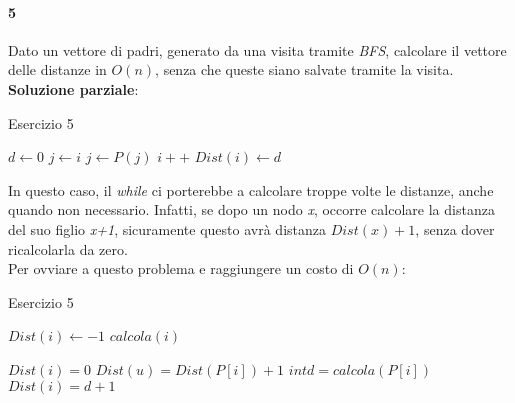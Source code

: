 \paragraph{5}
Dato un vettore di padri, generato da una visita tramite \textit{BFS}, calcolare il vettore delle distanze in $O(n)$, senza che queste siano salvate tramite la visita. \\
\textbf{Soluzione parziale}: \hfill
\begin{algorithm}
	\caption{Esercizio 5}\label{alg:es5}
	\begin{algorithmic}[1]
			\State $d \gets 0$
			\State $j \gets i$
				\State $j \gets P(j)$
				\State $i++$
			\EndWhile
			\State $Dist(i) \gets d$
		\EndFor
		\EndFunction
	\end{algorithmic}
\end{algorithm}
\hfill
In questo caso, il \textit{while} ci porterebbe a calcolare troppe volte le distanze, anche quando non necessario. Infatti, se dopo un nodo \textit{x}, occorre calcolare la distanza del suo figlio \textit{x+1}, sicuramente questo avrà distanza $Dist(x)+1$, senza dover ricalcolarla da zero. \\
Per ovviare a questo problema e raggiungere un costo di $O(n)$:
\begin{algorithm}
	\caption{Esercizio 5}\label{alg:es5-2}
	\begin{algorithmic}[1]
		\State $Dist(i) \gets -1$
				\State $calcola(i)$
			\EndIf
		\EndFor
		\EndFunction
	\end{algorithmic}
	\begin{algorithmic}[1]
			\State $ Dist(i) = 0 $
			\State $ Dist(u) = Dist(P[i]) + 1$
		\Else
			\State $int d = calcola(P[i])$
			\State $Dist(i) = d+1$
		\EndIf
		\EndFunction
	\end{algorithmic}
\end{algorithm}
\newpage

